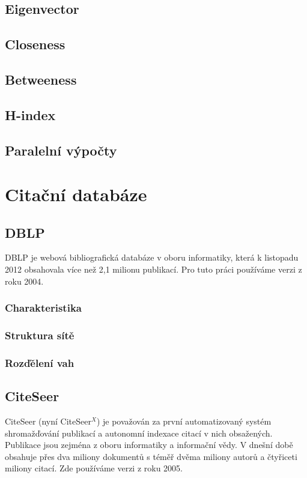 \documentclass[12pt,titlepage]{report}
\begin{document}
\subsection{Eigenvector}
\subsection{Closeness}
\subsection{Betweeness}
\subsection{H-index}

\subsection{Paralelní výpočty}

\section{Citační databáze}
\subsection{DBLP}
DBLP \cite{DBLP} je webová bibliografická databáze v oboru informatiky,
která k listopadu 2012 obsahovala více než 2,1 milionu publikací. Pro tuto
práci používáme verzi z roku 2004.

\subsubsection{Charakteristika}
\subsubsection{Struktura sítě}
\subsubsection{Rozďělení vah}

\subsection{CiteSeer}
CiteSeer (nyní CiteSeer$^X$) \cite{citeseer} je považován za první
automatizovaný systém shromažďování publikací a autonomní indexace citací v
nich obsažených. Publikace jsou zejména z oboru informatiky a informační vědy.
V dnešní době obsahuje přes dva miliony dokumentů s téměř dvěma miliony autorů
a čtyřiceti miliony citací. Zde používáme verzi z roku 2005.
\end{document}
